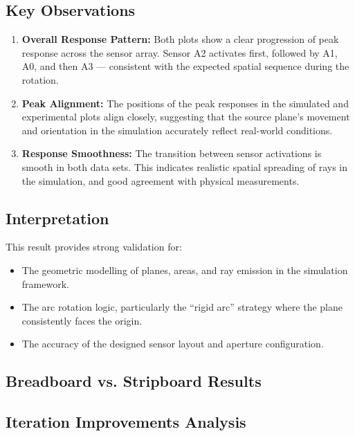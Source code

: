 \subsection*{Key Observations}
\begin{enumerate}
    \item \textbf{Overall Response Pattern:} Both plots show a clear progression of peak response across the sensor array. Sensor A2 activates first, followed by A1, A0, and then A3 — consistent with the expected spatial sequence during the rotation.
    
    \item \textbf{Peak Alignment:} The positions of the peak responses in the simulated and experimental plots align closely, suggesting that the source plane's movement and orientation in the simulation accurately reflect real-world conditions.
    
    \item \textbf{Response Smoothness:} The transition between sensor activations is smooth in both data sets. This indicates realistic spatial spreading of rays in the simulation, and good agreement with physical measurements.
\end{enumerate}

\subsection*{Interpretation}
This result provides strong validation for:
\begin{itemize}
    \item The geometric modelling of planes, areas, and ray emission in the simulation framework.
    \item The arc rotation logic, particularly the ``rigid arc'' strategy where the plane consistently faces the origin.
    \item The accuracy of the designed sensor layout and aperture configuration.
\end{itemize}


\subsection{Breadboard vs. Stripboard Results}

\subsection{Iteration Improvements Analysis}

